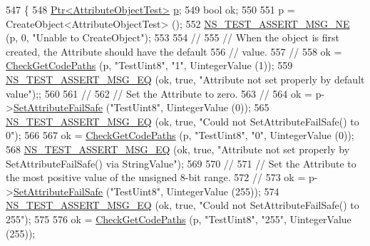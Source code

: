 \begin{DoxyCode}
547 \{
548   \hyperlink{classns3_1_1Ptr}{Ptr<AttributeObjectTest>} \hyperlink{lte__link__budget_8m_ac9de518908a968428863f829398a4e62}{p};
549   \textcolor{keywordtype}{bool} ok;
550 
551   p = CreateObject<AttributeObjectTest> ();
552   \hyperlink{group__testing_ga73d66fb0050a5111453fd144e767b91a}{NS\_TEST\_ASSERT\_MSG\_NE} (p, 0, \textcolor{stringliteral}{"Unable to CreateObject"});
553 
554   \textcolor{comment}{//}
555   \textcolor{comment}{// When the object is first created, the Attribute should have the default }
556   \textcolor{comment}{// value.}
557   \textcolor{comment}{//}
558   ok = \hyperlink{classAttributeTestCase_a902fb84c803f1c898329f9263575331e}{CheckGetCodePaths} (p, \textcolor{stringliteral}{"TestUint8"}, \textcolor{stringliteral}{"1"}, UintegerValue (1));
559   \hyperlink{group__testing_ga2a9d78cffb3db8e867c35fff0b698cf5}{NS\_TEST\_ASSERT\_MSG\_EQ} (ok, \textcolor{keyword}{true}, \textcolor{stringliteral}{"Attribute not set properly by default value"});;
560 
561   \textcolor{comment}{//}
562   \textcolor{comment}{// Set the Attribute to zero.}
563   \textcolor{comment}{//}
564   ok = p->\hyperlink{classns3_1_1ObjectBase_aa7d333004e970f925a4ed5df275541b5}{SetAttributeFailSafe} (\textcolor{stringliteral}{"TestUint8"}, UintegerValue (0));
565   \hyperlink{group__testing_ga2a9d78cffb3db8e867c35fff0b698cf5}{NS\_TEST\_ASSERT\_MSG\_EQ} (ok, \textcolor{keyword}{true}, \textcolor{stringliteral}{"Could not SetAttributeFailSafe() to 0"});
566 
567   ok = \hyperlink{classAttributeTestCase_a902fb84c803f1c898329f9263575331e}{CheckGetCodePaths} (p, \textcolor{stringliteral}{"TestUint8"}, \textcolor{stringliteral}{"0"}, UintegerValue (0));
568   \hyperlink{group__testing_ga2a9d78cffb3db8e867c35fff0b698cf5}{NS\_TEST\_ASSERT\_MSG\_EQ} (ok, \textcolor{keyword}{true}, \textcolor{stringliteral}{"Attribute not set properly by
       SetAttributeFailSafe() via StringValue"});
569 
570   \textcolor{comment}{//}
571   \textcolor{comment}{// Set the Attribute to the most positive value of the unsigned 8-bit range.}
572   \textcolor{comment}{//}
573   ok = p->\hyperlink{classns3_1_1ObjectBase_aa7d333004e970f925a4ed5df275541b5}{SetAttributeFailSafe} (\textcolor{stringliteral}{"TestUint8"}, UintegerValue (255));
574   \hyperlink{group__testing_ga2a9d78cffb3db8e867c35fff0b698cf5}{NS\_TEST\_ASSERT\_MSG\_EQ} (ok, \textcolor{keyword}{true}, \textcolor{stringliteral}{"Could not SetAttributeFailSafe() to 255"});
575 
576   ok = \hyperlink{classAttributeTestCase_a902fb84c803f1c898329f9263575331e}{CheckGetCodePaths} (p, \textcolor{stringliteral}{"TestUint8"}, \textcolor{stringliteral}{"255"}, UintegerValue (255));

\end{DoxyCode}
